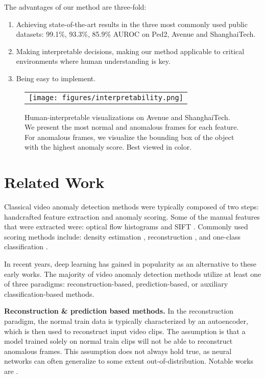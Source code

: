 \documentclass[10pt,twocolumn,letterpaper]{article}
\begin{document}
The advantages of our method are three-fold:
\begin{enumerate}
    \item Achieving state-of-the-art results in the three most commonly used public datasets: 99.1\%, 93.3\%, 85.9\% AUROC on Ped2, Avenue and ShanghaiTech.
    \item Making interpretable decisions, making our method applicable to critical environments where human understanding is key.
    \item Being easy to implement.
\end{enumerate}

\begin{figure*}[t]
  \centering
    \begin{tabular}{c}
    \texttt{[image: figures/interpretability.png]} 
    \end{tabular}
    \caption{Human-interpretable visualizations on Avenue and ShanghaiTech. We present the most normal and anomalous frames for each feature. For anomalous frames, we visualize the bounding box of the object with the highest anomaly score. Best viewed in color.}
    \label{fig:interpretability}
\end{figure*}

\section{Related Work}
Classical video anomaly detection methods were typically composed of two steps: handcrafted feature extraction and anomaly scoring. Some of the manual features that were extracted were: optical flow histograms \cite{hoof3,hoof,hoof2} and SIFT \cite{sift}. Commonly used scoring methods include: density estimation \cite{knn,gmm,kde}, reconstruction \cite{pca}, and one-class classification \cite{ocsvm}. 

In recent years, deep learning has gained in popularity as an alternative to these early works. The majority of video anomaly detection methods utilize at least one of three paradigms: reconstruction-based, prediction-based, or auxiliary classification-based methods. 

\textbf{Reconstruction \& prediction based methods.} In the reconstruction paradigm, the normal train data is typically characterized by an autoencoder, which is then used to reconstruct input video clips. The assumption is that a model trained solely on normal train clips will not be able to reconstruct anomalous frames. This assumption does not always hold true, as neural networks can often generalize to some extent out-of-distribution. Notable works are \cite{reconstruction_am_corr,reconstruction_clusterAE,reconstruction_convae,reconstruction_stackrnn,yu2020cloze,Park2020LearningMN}. 
\end{document}
